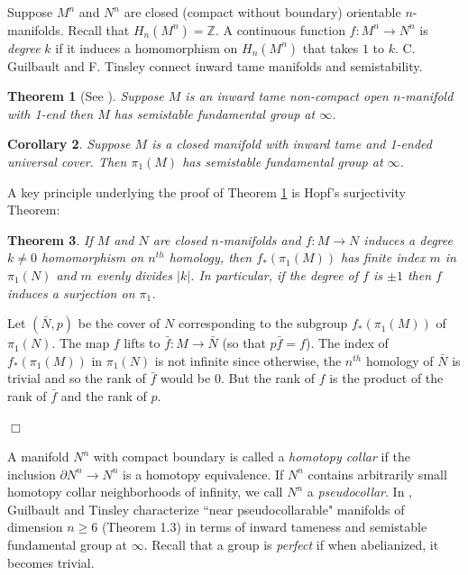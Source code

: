 \documentclass[12pt]{article}
\newtheorem{theorem}{Theorem}[subsection]
\newtheorem{corollary}[theorem]{Corollary}
\newenvironment{proof}{\addvspace{12pt}\noindent{\bf Proof:}}{
$\Box$\par\addvspace{12pt}}
\begin{document}
Suppose $M^n$ and $N^n$  are closed (compact without boundary) orientable $n$-manifolds. Recall that $H_n(M^n)=\mathbb Z$. A continuous function $f:M^n\to N^n$ is {\it degree} $k$ if it induces a homomorphism on $H_n(M^n)$ that takes $1$ to $k$. C. Guilbault and F. Tinsley connect inward tame manifolds and semistability. 

\begin{theorem} [See \cite{GuTi2}] \label{Degree1}  
Suppose $M$ is an inward tame non-compact open $n$-manifold with 1-end then $M$ has semistable fundamental group at $\infty$. 
\end{theorem}

\begin{corollary} \label{Deg1}
Suppose $M$ is a closed manifold with inward tame and 1-ended universal cover. Then $\pi_1(M)$ has semistable fundamental group at $\infty$. 
\end{corollary}
A key principle underlying the proof of Theorem \ref{Degree1} is Hopf's surjectivity Theorem:

\begin{theorem} \label{HThm} 
If $M$ and $N$ are closed $n$-manifolds and $f:M\to N$ induces a degree $k\ne 0$ homomorphism on $n^{th}$ homology, then $f_\ast(\pi_1(M))$ has finite index $m$ in $\pi_1(N)$ and $m$ evenly divides $|k|$. In particular, if the degree of $f$ is $\pm 1$ then $f$ induces a surjection on $\pi_1$. 
\end{theorem}

\begin{proof}
Let $(\bar N, p)$ be the cover of $N$ corresponding to the subgroup $f_\ast(\pi_1(M))$ of $\pi_1(N)$. The map $f$ lifts to $\bar f:M\to  \bar N$ (so that $p\bar f=f$). The index of $f_\ast(\pi_1(M))$ in $\pi_1(N)$ is not infinite since otherwise, the $n^{th}$ homology of $\bar N$ is trivial and so the rank of $\bar f$ would be $0$. But the rank of $f$ is the product of the rank of $\bar f$ and the rank of $p$.
\end{proof}

A manifold $N^n$  with compact boundary is called a {\it homotopy collar} if the inclusion $\partial N^n\to N^n$ 
is a homotopy equivalence. If $N^n$ contains arbitrarily small homotopy collar
neighborhoods of infinity, we call $N^n$ a {\it pseudocollar}. In \cite{GuTi}, Guilbault and Tinsley characterize ``near pseudocollarable" manifolds of dimension $n\geq 6$ (Theorem 1.3) in terms of inward tameness and semistable fundamental group at $\infty$. Recall that a group is {\it perfect} if when abelianized, it becomes trivial. 
\end{document}
